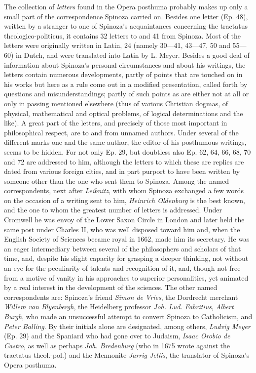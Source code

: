 \documentclass[12pt,a4paper,openany]{book}
\newcommand{\opage}[1]{\marginnote{\footnotesize\textit{[#1]}}}
\begin{document}
The collection of \emph{letters} found in the Opera posthuma probably
makes up only a small part of the correspondence Spinoza carried on.
Besides one letter (Ep. 48), written by a stranger to one of Spinoza's
acquaintances concerning the tractatus theologico-politicus, it contains
32 letters to and 41 from Spinoza. Most of the letters were originally
written in Latin, 24 (namely 30---41, 43---47, 50 and 55---60) in Dutch,
and were translated into Latin by L. Meyer. Besides a good deal of
information about Spinoza's personal circumstances and about his
writings, the letters contain numerous developments, partly of points
that are touched on in his works but here as a rule come out in a
modified presentation, called forth by questions and misunderstandings;
partly of such points as are either not at all or only in passing
\opage{40}mentioned elsewhere (thus of various Christian dogmas, of
physical, mathematical and optical problems, of logical determinations
and the like). A great part of the letters, and precisely of those most
important in philosophical respect, are to and from unnamed authors.
Under several of the different marks one and the same author, the editor
of his posthumous writings, seems to be hidden. For not only Ep. 29, but
doubtless also Ep. 62, 64, 66, 68, 70 and 72 are addressed to him,
although the letters to which these are replies are dated from various
foreign cities, and in part purport to have been written by someone
other than the one who sent them to Spinoza. Among the named
correspondents, next after \emph{Leibnitz}, with whom Spinoza exchanged a
few words on the occasion of a writing sent to him, \emph{Heinrich
Oldenburg} is the best known, and the one to whom the greatest number of
letters is addressed. Under Cromwell he was envoy of the Lower Saxon
Circle in London and later held the same post under Charles II, who was
well disposed toward him and, when the English Society of Sciences
became royal in 1662, made him its secretary. He was an eager
intermediary between several of the philosophers and scholars of that
time, and, despite his slight capacity for grasping a deeper thinking,
not without an eye for the peculiarity of talents and recognition of it,
and, though not free from a motive of vanity in his approaches to
superior personalities, yet animated by a real interest in the
development of the sciences. The other named correspondents are:
Spinoza's friend \emph{Simon de Vries}, the Dordrecht merchant
\emph{Willem van Blyenbergh}, the Heidelberg professor \emph{Joh. Lud.
Fabritius}, \emph{Albert Burgh}, who made an unsuccessful attempt to
convert Spinoza to Catholicism, and \emph{Peter Balling}. By their
initials alone are designated, among others, \emph{Ludvig Meyer} (Ep.
29) and the Spaniard who had gone over to Judaism, \emph{Isaac Orobio de
Castro}, as well as perhaps \emph{Joh. Bredenburg} (who in 1675 wrote
against the tractatus theol.-pol.) and the Mennonite \emph{Jarrig
Jellis}, the translator of Spinoza's Opera posthuma.
\end{document}
